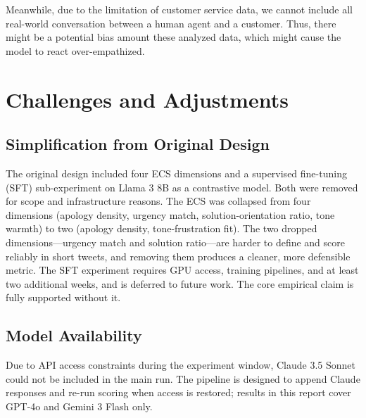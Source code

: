 \documentclass[11pt]{article}
\begin{document}
Meanwhile, due to the limitation of customer service data, we cannot include all real-world conversation between a human agent and a customer. Thus, there might be a potential bias amount these analyzed data, which might cause the model to react over-empathized. 






\section{Challenges and Adjustments}

\subsection{Simplification from Original Design}

The original design included four ECS dimensions and a supervised fine-tuning (SFT) sub-experiment on Llama 3 8B as a contrastive model. Both were removed for scope and infrastructure reasons. The ECS was collapsed from four dimensions (apology density, urgency match, solution-orientation ratio, tone warmth) to two (apology density, tone-frustration fit). The two dropped dimensions---urgency match and solution ratio---are harder to define and score reliably in short tweets, and removing them produces a cleaner, more defensible metric. The SFT experiment requires GPU access, training pipelines, and at least two additional weeks, and is deferred to future work. The core empirical claim is fully supported without it.

\subsection{Model Availability}

Due to API access constraints during the experiment window, Claude 3.5 Sonnet could not be included in the main run. The pipeline is designed to append Claude responses and re-run scoring when access is restored; results in this report cover GPT-4o and Gemini 3 Flash only.






\appendix
\end{document}

